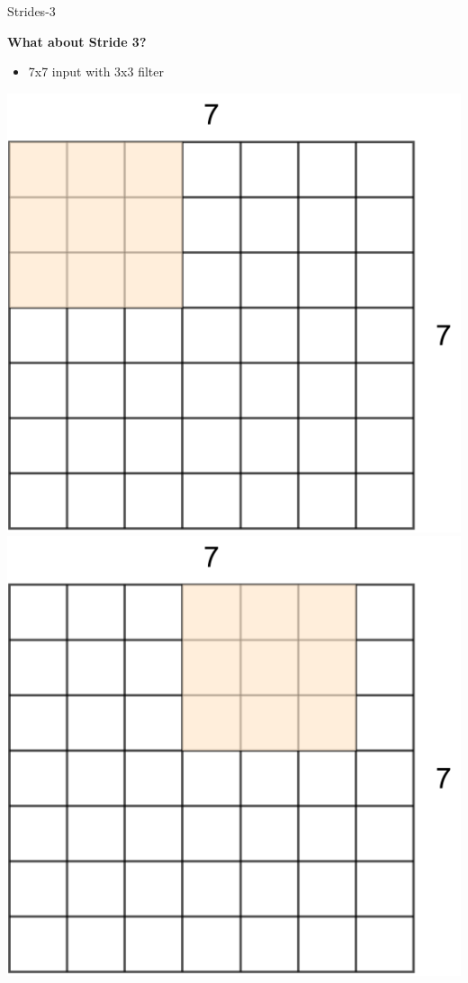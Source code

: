 \documentclass[default, aspectratio=169]{beamer}
\begin{document}
	\begin{frame}{Strides-3}
		\vspace{0.5cm}
		
		\textbf{What about Stride 3?}
		\begin{itemize}
			\item 7x7 input with 3x3 filter
		\end{itemize}
		
		\centering
		\includegraphics[keepaspectratio, scale=0.2]{pic/Stride9.png}
		\hspace{0.2cm}
		\includegraphics[keepaspectratio, scale=0.2]{pic/Stride10.png}

\end{frame}
\end{document}
